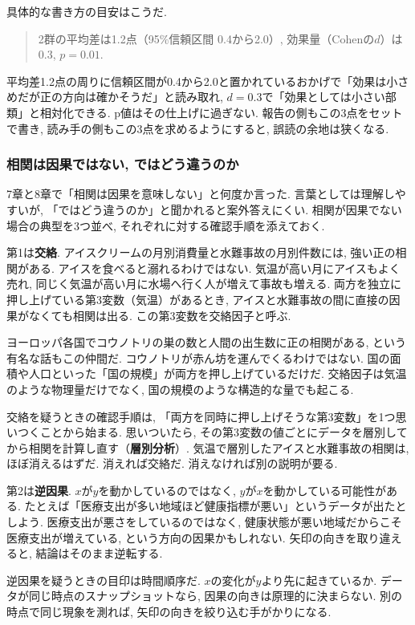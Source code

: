 具体的な書き方の目安はこうだ.

\begin{quote}
2群の平均差は1.2点（95\%信頼区間 0.4から2.0）, 効果量（Cohenの$d$）は0.3, $p = 0.01$.
\end{quote}

平均差1.2点の周りに信頼区間が0.4から2.0と置かれているおかげで「効果は小さめだが正の方向は確かそうだ」と読み取れ, $d = 0.3$で「効果としては小さい部類」と相対化できる. p値はその仕上げに過ぎない.
報告の側もこの3点をセットで書き, 読み手の側もこの3点を求めるようにすると, 誤読の余地は狭くなる.

\subsubsection*{相関は因果ではない, ではどう違うのか}

7章と8章で「相関は因果を意味しない」と何度か言った.
言葉としては理解しやすいが, 「ではどう違うのか」と聞かれると案外答えにくい.
相関が因果でない場合の典型を3つ並べ, それぞれに対する確認手順を添えておく.

第1は\textbf{交絡}.
アイスクリームの月別消費量と水難事故の月別件数には, 強い正の相関がある.
アイスを食べると溺れるわけではない. 気温が高い月にアイスもよく売れ, 同じく気温が高い月に水場へ行く人が増えて事故も増える.
両方を独立に押し上げている第3変数（気温）があるとき, アイスと水難事故の間に直接の因果がなくても相関は出る.
この第3変数を交絡因子と呼ぶ.

ヨーロッパ各国でコウノトリの巣の数と人間の出生数に正の相関がある, という有名な話もこの仲間だ.
コウノトリが赤ん坊を運んでくるわけではない. 国の面積や人口といった「国の規模」が両方を押し上げているだけだ.
交絡因子は気温のような物理量だけでなく, 国の規模のような構造的な量でも起こる.

交絡を疑うときの確認手順は, 「両方を同時に押し上げそうな第3変数」を1つ思いつくことから始まる.
思いついたら, その第3変数の値ごとにデータを層別してから相関を計算し直す（\textbf{層別分析}）.
気温で層別したアイスと水難事故の相関は, ほぼ消えるはずだ.
消えれば交絡だ. 消えなければ別の説明が要る.

第2は\textbf{逆因果}.
$x$が$y$を動かしているのではなく, $y$が$x$を動かしている可能性がある.
たとえば「医療支出が多い地域ほど健康指標が悪い」というデータが出たとしよう.
医療支出が悪さをしているのではなく, 健康状態が悪い地域だからこそ医療支出が増えている, という方向の因果かもしれない.
矢印の向きを取り違えると, 結論はそのまま逆転する.

逆因果を疑うときの目印は時間順序だ.
$x$の変化が$y$より先に起きているか. データが同じ時点のスナップショットなら, 因果の向きは原理的に決まらない.
別の時点で同じ現象を測れば, 矢印の向きを絞り込む手がかりになる.

